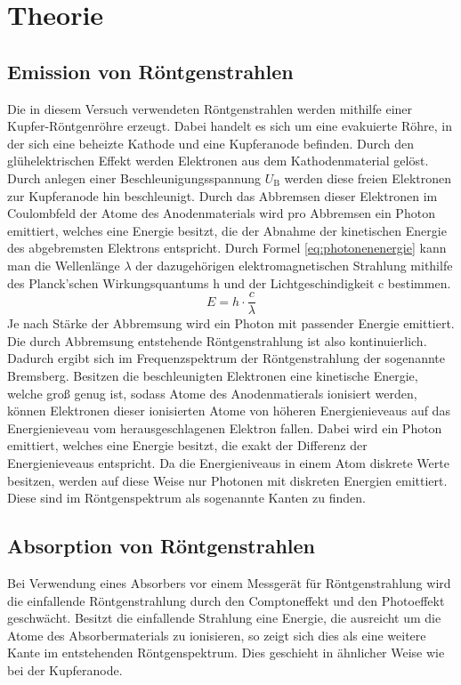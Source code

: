 
\section{Theorie}
%
\subsection{Emission von Röntgenstrahlen}
%
Die in diesem Versuch verwendeten Röntgenstrahlen werden mithilfe einer
Kupfer-Röntgenröhre erzeugt. Dabei handelt es sich um eine evakuierte
Röhre, in der sich eine beheizte Kathode und eine Kupferanode
befinden. Durch den glühelektrischen Effekt werden Elektronen aus dem
Kathodenmaterial gelöst. Durch anlegen einer Beschleunigungsspannung
$U_\text{B}$ werden diese freien Elektronen zur Kupferanode hin
beschleunigt. Durch das Abbremsen dieser Elektronen im Coulombfeld der
Atome des Anodenmaterials wird pro Abbremsen ein Photon emittiert,
welches eine Energie besitzt, die der Abnahme der kinetischen Energie
des abgebremsten Elektrons entspricht. Durch Formel
\eqref{eq:photonenenergie} kann man die Wellenlänge $\lambda$ der
dazugehörigen elektromagnetischen Strahlung mithilfe des Planck'schen
Wirkungsquantums h und der Lichtgeschindigkeit c bestimmen.
%
\begin{equation}
E = h \cdot \frac{c}{\lambda}
\label{eq:photonenenergie}
\end{equation}
%
Je nach Stärke der Abbremsung wird ein Photon mit passender Energie
emittiert. Die durch Abbremsung entstehende Röntgenstrahlung ist also
kontinuierlich. Dadurch ergibt sich im Frequenzspektrum der
Röntgenstrahlung der sogenannte Bremsberg. Besitzen die beschleunigten
Elektronen eine kinetische Energie, welche groß genug ist, sodass Atome
des Anodenmatierals ionisiert werden, können Elektronen dieser
ionisierten Atome von höheren Energienieveaus auf das Energienieveau vom
herausgeschlagenen Elektron fallen. Dabei wird ein Photon emittiert,
welches eine Energie besitzt, die exakt der Differenz der
Energienieveaus entspricht. Da die Energieniveaus in einem Atom diskrete
Werte besitzen, werden auf diese Weise nur Photonen mit diskreten
Energien emittiert. Diese sind im Röntgenspektrum als sogenannte Kanten
zu finden.

%
\subsection{Absorption von Röntgenstrahlen}
%
Bei Verwendung eines Absorbers vor einem Messgerät für Röntgenstrahlung
wird die einfallende Röntgenstrahlung durch den Comptoneffekt und den
Photoeffekt geschwächt. Besitzt die einfallende Strahlung eine Energie,
die ausreicht um die Atome des Absorbermaterials zu ionisieren, so zeigt
sich dies als eine weitere Kante im entstehenden Röntgenspektrum. Dies
geschieht in ähnlicher Weise wie bei der Kupferanode.


